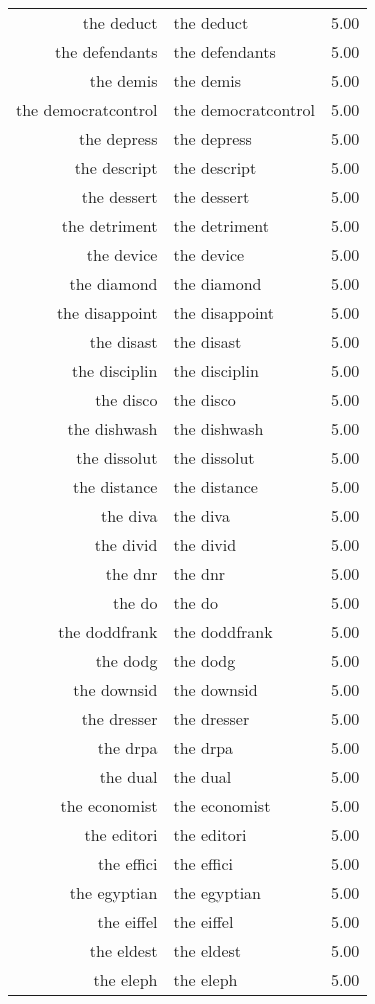 \begin{table}[ht]
\begin{tabular}{rlr}
  the deduct & the deduct & 5.00 \\ 
  the defendants & the defendants & 5.00 \\ 
  the demis & the demis & 5.00 \\ 
  the democratcontrol & the democratcontrol & 5.00 \\ 
  the depress & the depress & 5.00 \\ 
  the descript & the descript & 5.00 \\ 
  the dessert & the dessert & 5.00 \\ 
  the detriment & the detriment & 5.00 \\ 
  the device & the device & 5.00 \\ 
  the diamond & the diamond & 5.00 \\ 
  the disappoint & the disappoint & 5.00 \\ 
  the disast & the disast & 5.00 \\ 
  the disciplin & the disciplin & 5.00 \\ 
  the disco & the disco & 5.00 \\ 
  the dishwash & the dishwash & 5.00 \\ 
  the dissolut & the dissolut & 5.00 \\ 
  the distance & the distance & 5.00 \\ 
  the diva & the diva & 5.00 \\ 
  the divid & the divid & 5.00 \\ 
  the dnr & the dnr & 5.00 \\ 
  the do & the do & 5.00 \\ 
  the doddfrank & the doddfrank & 5.00 \\ 
  the dodg & the dodg & 5.00 \\ 
  the downsid & the downsid & 5.00 \\ 
  the dresser & the dresser & 5.00 \\ 
  the drpa & the drpa & 5.00 \\ 
  the dual & the dual & 5.00 \\ 
  the economist & the economist & 5.00 \\ 
  the editori & the editori & 5.00 \\ 
  the effici & the effici & 5.00 \\ 
  the egyptian & the egyptian & 5.00 \\ 
  the eiffel & the eiffel & 5.00 \\ 
  the eldest & the eldest & 5.00 \\ 
  the eleph & the eleph & 5.00 \\ 

\end{tabular}
\end{table}
